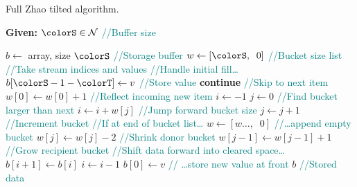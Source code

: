\begin{algorithm}[H]
\caption{Full Zhao tilted algorithm.}
\label{alg:zhao-tilted-full}
\begin{minipage}{0.5\textwidth}
    \hspace*{\algorithmicindent} \textbf{Given:} $\colorS \in \mathcal{N}$ \textcolor{teal}{\small//Buffer size}
    \hspace*{\algorithmicindent}    \begin{algorithmic}[1]
        \State $b \gets$ array, size $\colorS$ \textcolor{teal}{\small//Storage buffer}
        \State $w \gets [\colorS, \;\; 0]$ \textcolor{teal}{\small//Bucket size list}
         \textcolor{teal}{\small//Take stream indices and values}
         \textcolor{teal}{\small//Handle initial fill\ldots}
        \State $b[\colorS - 1 - \colorT] \gets v$ \textcolor{teal}{\small//Store value}
        \State \textbf{continue} \textcolor{teal}{\small//Skip to next item}
        \EndIf
        \State $w[0] \gets w[0] + 1$  \textcolor{teal}{\small//Reflect incoming new item}
        \State $i \gets -1$
        \State $j \gets 0$
         \textcolor{teal}{\small//Find bucket larger than next}
        \State $i \gets i + w[j]$ \textcolor{teal}{\small//Jump forward bucket size}
        \State $j \gets j + 1$ \textcolor{teal}{\small//Increment bucket}
         \textcolor{teal}{\small//If at end of bucket list\ldots}
        \State $w \gets [w\ldots,\;\; 0]$ \textcolor{teal}{\small//\ldots append empty bucket}
        \EndIf
        \EndWhile
        \State $w[j] \gets w[j] - 2$ \textcolor{teal}{\small //Shrink donor bucket}
        \State $w[j - 1] \gets w[j - 1] + 1$ \textcolor{teal}{\small //Grow recipient bucket}
         \textcolor{teal}{\small//Shift data forward into cleared space\ldots}
        \State $b[i + 1] \gets b[i]$
        \State $i \gets i - 1$
        \EndWhile
        \State $b[0] \gets v$ \textcolor{teal}{\small// \ldots store new value at front}
        \EndFor
        \Return $b$ \textcolor{teal}{\small//Stored data}
    \end{algorithmic}
\end{minipage}
\end{algorithm}
